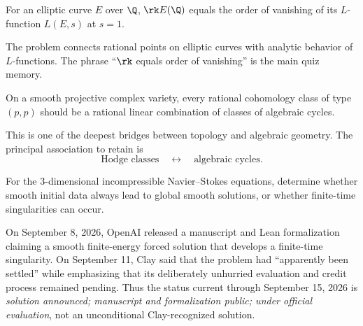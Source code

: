     \begin{conjecture}
        For an elliptic curve $E$ over $\Q$, $\rk E(\Q)$ equals the order
        of vanishing of its $L$-function $L(E,s)$ at $s=1$.
    \end{conjecture}

    \begin{remark}
        The problem connects rational points on elliptic curves with analytic
        behavior of $L$-functions. The phrase ``$\rk$ equals order of vanishing''
        is the main quiz memory.
    \end{remark}

    \begin{conjecture}
        On a smooth projective complex variety, every rational cohomology class
        of type $(p,p)$ should be a rational linear combination of classes of
        algebraic cycles.
    \end{conjecture}

    \begin{remark}
        This is one of the deepest bridges between topology and algebraic
        geometry. The principal association to retain is
        \[
            \text{Hodge classes} \quad\longleftrightarrow\quad
            \text{algebraic cycles}.
        \]
    \end{remark}

    \begin{openproblem}
        For the $3$-dimensional incompressible Navier--Stokes equations,
        determine whether smooth initial data always lead to global smooth
        solutions, or whether finite-time singularities can occur.
    \end{openproblem}

    \begin{remark}
        On September 8, 2026, OpenAI released a manuscript and Lean
        formalization claiming a smooth finite-energy forced solution that
        develops a finite-time singularity. On September 11, Clay said that the
        problem had ``apparently been settled'' while emphasizing that its
        deliberately unhurried evaluation and credit process remained pending.
        Thus the status current through September 15, 2026 is
        \emph{solution announced; manuscript and formalization public; under
        official evaluation}, not an unconditional Clay-recognized solution.
    \end{remark}

